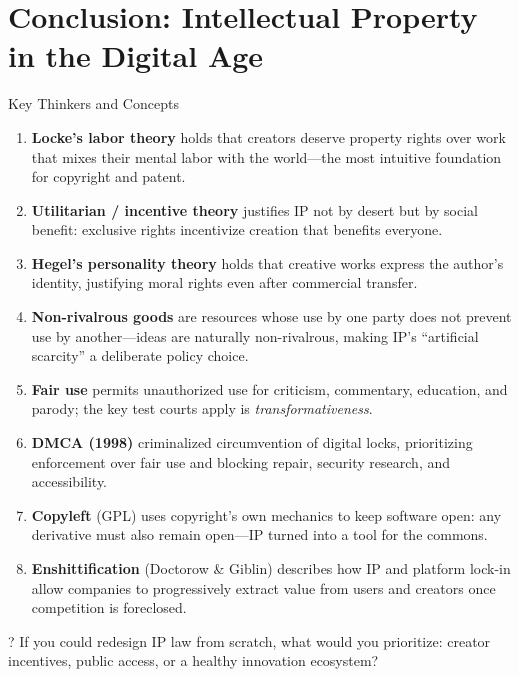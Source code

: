 \documentclass[aspectratio=169]{beamer}
\begin{document}
\section{Conclusion: Intellectual Property in the Digital Age}
\begin{frame}{Key Thinkers and Concepts}
{\footnotesize
\begin{enumerate}
    \item \textbf{Locke's labor theory} holds that creators deserve property rights over work that mixes their mental labor with the world---the most intuitive foundation for copyright and patent.
    \item \textbf{Utilitarian / incentive theory} justifies IP not by desert but by social benefit: exclusive rights incentivize creation that benefits everyone.
    \item \textbf{Hegel's personality theory} holds that creative works express the author's identity, justifying moral rights even after commercial transfer.
    \item \textbf{Non-rivalrous goods} are resources whose use by one party does not prevent use by another---ideas are naturally non-rivalrous, making IP's ``artificial scarcity'' a deliberate policy choice.
    \item \textbf{Fair use} permits unauthorized use for criticism, commentary, education, and parody; the key test courts apply is \textit{transformativeness}.
    \item \textbf{DMCA (1998)} criminalized circumvention of digital locks, prioritizing enforcement over fair use and blocking repair, security research, and accessibility.
    \item \textbf{Copyleft} (GPL) uses copyright's own mechanics to keep software open: any derivative must also remain open---IP turned into a tool for the commons.
    \item \textbf{Enshittification} (Doctorow \& Giblin) describes how IP and platform lock-in allow companies to progressively extract value from users and creators once competition is foreclosed.
\end{enumerate}
}

\begin{alertblock}{?}
If you could redesign IP law from scratch, what would you prioritize: creator incentives, public access, or a healthy innovation ecosystem?
\end{alertblock}
\end{frame}
\end{document}
